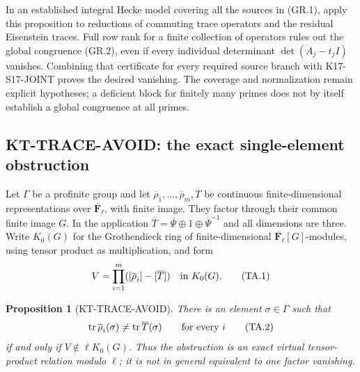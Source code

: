 \documentclass[11pt,a4paper]{article}
\newtheorem{proposition}[theorem]{Proposition}
\theoremstyle{definition}
\begin{document}
In an established integral Hecke model covering all the
sources in (GR.1), apply this proposition to reductions
of commuting trace operators and the residual Eisenstein
traces. Full row rank for a finite collection of operators
rules out the global congruence (GR.2), even if every
individual determinant $\det(A_j-t_jI)$ vanishes.
Combining that certificate for every required source
branch with K17-S17-JOINT proves the desired vanishing.
The coverage and normalization remain explicit hypotheses;
a deficient block for finitely many primes does not by
itself establish a global congruence at all primes.




\subsection{KT-TRACE-AVOID: the exact single-element obstruction}
\label{sec:kt-trace-avoid}

Let $\Gamma$ be a profinite group and let
$\overline\rho_1,\ldots,\overline\rho_m,\overline T$
be continuous finite-dimensional representations over
$\overline{\mathbf F}_\ell$, with finite image. They
factor through their common finite image $G$. In the
application $\overline T=\overline\Psi\oplus1\oplus
\overline\Psi^{-1}$ and all dimensions are three.
Write $K_0(G)$ for the Grothendieck ring of finite-dimensional
$\overline{\mathbf F}_\ell[G]$-modules, using tensor product
as multiplication, and form
\[
        V=\prod_{i=1}^m([\overline\rho_i]-[\overline T])
                          \quad\hbox{in }K_0(G).
                                                               \tag{TA.1}
\]

\begin{proposition}[KT-TRACE-AVOID]
There is an element $\sigma\in\Gamma$ such that
\[
 \operatorname{tr}\overline\rho_i(\sigma)
       \ne\operatorname{tr}\overline T(\sigma)
                     \qquad\hbox{for every }i
                                                               \tag{TA.2}
\]
if and only if $V\notin\ell K_0(G)$. Thus the obstruction
is an exact virtual tensor-product relation modulo $\ell$;
it is not in general equivalent to one factor vanishing.
\end{proposition}
\end{document}

